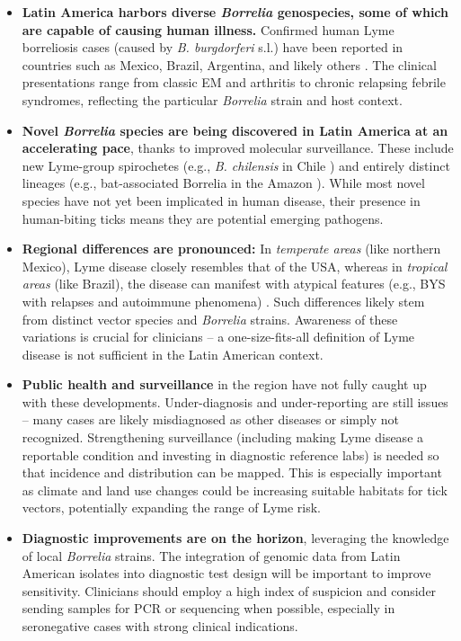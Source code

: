 \documentclass[11pt,letterpaper]{article}
\begin{document}
\begin{itemize}
    \item \textbf{Latin America harbors diverse \textit{Borrelia} genospecies, some of which are capable of causing human illness.} Confirmed human Lyme borreliosis cases (caused by \textit{B. burgdorferi} s.l.) have been reported in countries such as Mexico, Brazil, Argentina, and likely others \citep{Colunga-Salas2020r, Lucca2024x}. The clinical presentations range from classic EM and arthritis to chronic relapsing febrile syndromes, reflecting the particular \textit{Borrelia} strain and host context.

    \item \textbf{Novel \textit{Borrelia} species are being discovered in Latin America at an accelerating pace}, thanks to improved molecular surveillance. These include new Lyme-group spirochetes (e.g., \textit{B. chilensis} in Chile \citep{Ivanova2014g}) and entirely distinct lineages (e.g., bat-associated Borrelia in the Amazon \citep{Lucca2024y}). While most novel species have not yet been implicated in human disease, their presence in human-biting ticks means they are potential emerging pathogens.

    \item \textbf{Regional differences are pronounced:} In \textit{temperate areas} (like northern Mexico), Lyme disease closely resembles that of the USA, whereas in \textit{tropical areas} (like Brazil), the disease can manifest with atypical features (e.g., BYS with relapses and autoimmune phenomena) \citep{Yoshinari2022ap, Yoshinari2022aq}. Such differences likely stem from distinct vector species and \textit{Borrelia} strains. Awareness of these variations is crucial for clinicians – a one-size-fits-all definition of Lyme disease is not sufficient in the Latin American context.

    \item \textbf{Public health and surveillance} in the region have not fully caught up with these developments. Under-diagnosis and under-reporting are still issues – many cases are likely misdiagnosed as other diseases or simply not recognized. Strengthening surveillance (including making Lyme disease a reportable condition and investing in diagnostic reference labs) is needed so that incidence and distribution can be mapped. This is especially important as climate and land use changes could be increasing suitable habitats for tick vectors, potentially expanding the range of Lyme risk.

    \item \textbf{Diagnostic improvements are on the horizon}, leveraging the knowledge of local \textit{Borrelia} strains. The integration of genomic data from Latin American isolates into diagnostic test design will be important to improve sensitivity. Clinicians should employ a high index of suspicion and consider sending samples for PCR or sequencing when possible, especially in seronegative cases with strong clinical indications.


\end{itemize}
\end{document}
